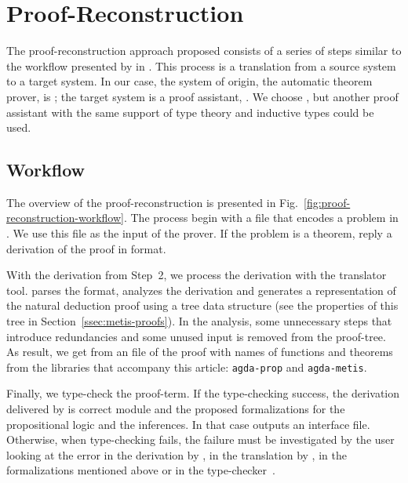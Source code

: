 \documentclass[../main.tex]{subfiles}
\begin{document}

\section{Proof-Reconstruction}
\label{sec:proof-reconstruction}

The proof-reconstruction approach proposed consists of a series
of steps similar to the workflow presented by \citeauthor{sultana2015} in
\cite{sultana2015}. This process is a translation from a source
system to a target system. In our case, the system of origin, the
automatic theorem prover, is \Metis; the target system is a proof
assistant, \Agda. We choose \Agda, but another proof assistant with the
same support of type theory and inductive types could be used.

\subsection{Workflow}
\label{ssec:workflow}


The overview of the proof-reconstruction is presented in
Fig.~\ref{fig:proof-reconstruction-workflow}. The process begin with
a \TPTP file that encodes a problem in \CPL. We use this file as the
input of the \Metis prover. If the problem is a theorem, \Metis
reply a derivation of the proof in \TSTP format.

With the \TSTP derivation from Step~2, we process the derivation with the
\Athena translator tool.
\Athena parses the \TSTP format, analyzes the
derivation and generates a representation of the natural deduction
proof using a tree data structure (see the properties
of this tree in Section~\ref{ssec:metis-proofs}).
In the \Athena analysis, some unnecessary steps that introduce redundancies
and some unused input is removed from the proof-tree.
As result, we get from \Athena an \Agda file of the proof
with names of functions and theorems from
the \Agda libraries that accompany this article:
\texttt{agda-prop} and \texttt{agda-metis}.

Finally, we type-check the \Agda proof-term. If the type-checking
success, the \TSTP derivation delivered by \Metis is correct
module \Agda and the proposed formalizations for the
propositional logic and the \Metis inferences.
In that case \Agda outputs an interface file.
Otherwise, when type-checking fails, the failure must be
investigated by the user looking at the error in the \TSTP derivation
by \Metis, in the translation by \Athena, in the \Agda formalizations
mentioned above or in the type-checker~\Agda.
\end{document}
